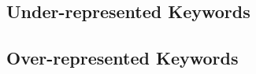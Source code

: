 

\subsection{Under-represented Keywords}
\centering



\subsection{Over-represented Keywords}
\centering





